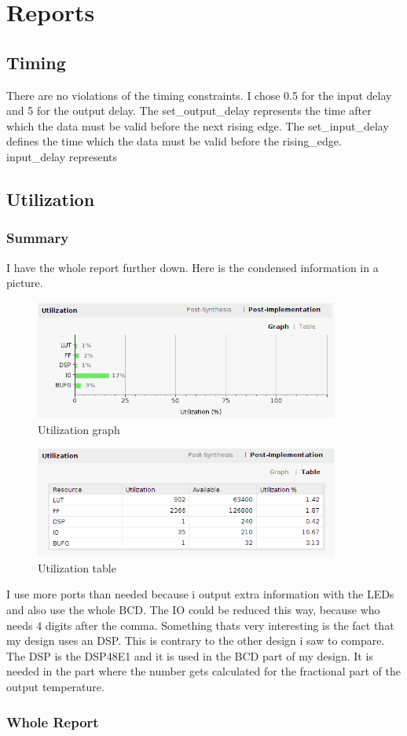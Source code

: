 \section{Reports}

\subsection{Timing}
There are no violations of the timing constraints. I chose 0.5 for the input delay and 5 for the output delay.
The set_output_delay represents the time after which the data must be valid before the next rising edge.
 The set_input_delay defines the time which the data must be valid before the rising_edge.
input_delay represents 


\subsection{Utilization}
\subsubsection{Summary}
I have the whole report further down. Here is the condensed information in a picture.
\begin{figure}[h!]
	\centering
	\includegraphics[width=10cm]{fig/utilizationgraph}
	\caption{Utilization graph}
\end{figure}
\begin{figure}[h!]
	\centering
	\includegraphics[width=10cm]{fig/utilizationtable}
	\caption{Utilization table}
\end{figure}

I use more ports than needed because i output extra information with the LEDs and also
use the whole BCD. The IO could be reduced this way, because who needs 4 digits after the
comma.
Something thats very interesting is the fact that my design uses an DSP. This is contrary to the other
design i saw to compare. The DSP is the
DSP48E1 and it is used in the BCD part of my design. It is needed in the part where the
number gets calculated for the fractional part of the output temperature.


\subsubsection{Whole Report}
